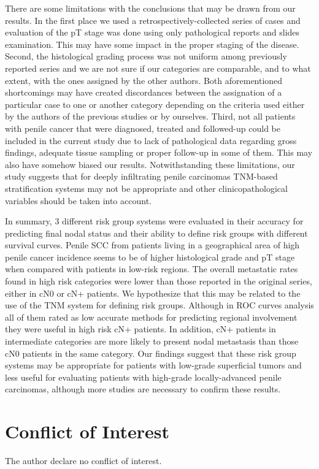 \documentclass[11pt,letterpaper]{article}\usepackage[]{graphicx}\usepackage[]{color}
\begin{document}
\begin{multicols}{2}
There are some limitations with the conclusions that may be drawn from our results. In the first place we used a retrospectively-collected series of cases and evaluation of the pT stage was done using only pathological reports and slides examination. This may have some impact in the proper staging of the disease. Second, the histological grading process was not uniform among previously reported series and we are not sure if our categories are comparable, and to what extent, with the ones assigned by the other authors. Both aforementioned shortcomings may have created discordances between the assignation of a particular case to one or another category depending on the criteria used either by the authors of the previous studies or by ourselves. Third, not all patients with penile cancer that were diagnosed, treated and followed-up could be included in the current study due to lack of pathological data regarding gross findings, adequate tissue sampling or proper follow-up in some of them. This may also have somehow biased our results. Notwithstanding these limitations, our study suggests that for deeply infiltrating penile carcinomas TNM-based stratification systems may not be appropriate and other clinicopathological variables should be taken into account.

In summary, 3 different risk group systems were evaluated in their accuracy for predicting final nodal status and their ability to define risk groups with different survival curves. Penile SCC from patients living in a geographical area of high penile cancer incidence seems to be of higher histological grade and pT stage when compared with patients in low-risk regions. The overall metastatic rates found in high risk categories were lower than those reported in the original series, either in cN0 or cN+ patients. We hypothesize that this may be related to the use of the TNM system for defining risk groups. Although in ROC curves analysis all of them rated as low accurate methods for predicting regional involvement they were useful in high risk cN+ patients. In addition, cN+ patients in intermediate categories are more likely to present nodal metastasis than those cN0 patients in the same category. Our findings suggest that these risk group systems may be appropriate for patients with low-grade superficial tumors and less useful for evaluating patients with high-grade locally-advanced penile carcinomas, although more studies are necessary to confirm these results.

\section*{Conflict of Interest}
The author declare no conflict of interest.


\end{multicols}
\end{document}
